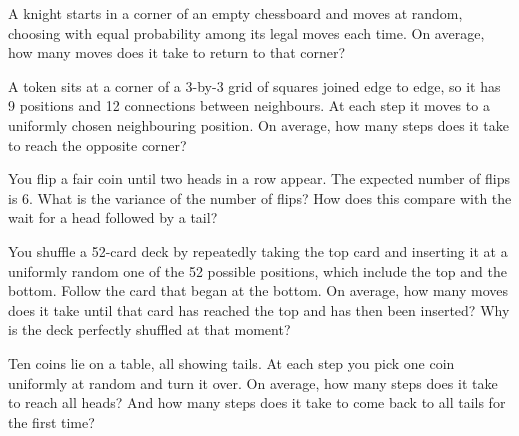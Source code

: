 \begin{question}\label{iq:iv1:waiting-times-and-markov-chains:17}
A knight starts in a corner of an empty chessboard and moves at random, choosing with equal probability among its legal moves each time. On average, how many moves does it take to return to that corner?
\end{question}

\begin{question}\label{iq:iv1:waiting-times-and-markov-chains:18}
A token sits at a corner of a 3-by-3 grid of squares joined edge to edge, so it has 9 positions and 12 connections between neighbours. At each step it moves to a uniformly chosen neighbouring position. On average, how many steps does it take to reach the opposite corner?
\end{question}

\begin{question}\label{iq:iv1:waiting-times-and-markov-chains:19}
You flip a fair coin until two heads in a row appear. The expected number of flips is 6. What is the variance of the number of flips? How does this compare with the wait for a head followed by a tail?
\end{question}

\begin{question}\label{iq:iv1:waiting-times-and-markov-chains:20}
You shuffle a 52-card deck by repeatedly taking the top card and inserting it at a uniformly random one of the 52 possible positions, which include the top and the bottom. Follow the card that began at the bottom. On average, how many moves does it take until that card has reached the top and has then been inserted? Why is the deck perfectly shuffled at that moment?
\end{question}

\begin{question}\label{iq:iv1:waiting-times-and-markov-chains:21}
Ten coins lie on a table, all showing tails. At each step you pick one coin uniformly at random and turn it over. On average, how many steps does it take to reach all heads? And how many steps does it take to come back to all tails for the first time?
\end{question}

